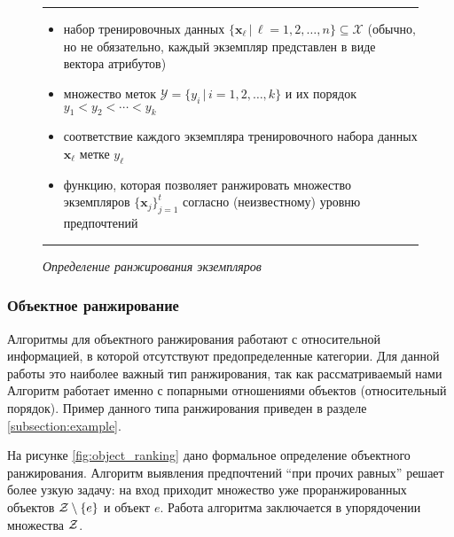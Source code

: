 		\begin{figure}[h]
			\hrule
			\begin{description}[nosep]
				\item[Дано:] \null\leavevmode
				\begin{itemize}[itemsep=0pt,leftmargin=2ex,label=\textbf{---}]
					\item набор тренировочных данных $\{\bm{x}_\ell \, | \, \ell = 1,2,\dots,n\} \subseteq \mathcal{X} $ (обычно, но не обязательно, каждый экземпляр представлен в виде вектора атрибутов)
					\item множество меток $\mathcal{Y} = \{y_i\,|\,i = 1,2,\dotsc,k\}$ и их порядок $y_1 < y_2 < \dotsb < y_k$ 
					\item соответствие каждого экземпляра тренировочного набора данных $\bm{x}_\ell$ метке $y_\ell$
				\end{itemize}
				\item[Найти:] \null\leavevmode
				\begin{itemize}[itemsep=0pt,leftmargin=2ex,label=\textbf{---}]
					\item функцию, которая позволяет ранжировать множество экземпляров $\{\bm{x}_j\}^t_{j=1}$ согласно (неизвестному) уровню предпочтений
				\end{itemize}
			\end{description} 
			\hrule
			\caption{\it Определение ранжирования экземпляров \cite[Рис.~2]{plbook:Introduction:2010}}
			\label{fig:instance_ranking}
		\end{figure}
	
	\subsubsection{Объектное ранжирование}
		Алгоритмы для объектного ранжирования работают с 
		относительной %
		информацией, в которой отсутствуют предопределенные категории. Для данной работы это наиболее важный тип ранжирования, так как рассматриваемый нами Алгоритм работает именно с попарными отношениями объектов (относительный порядок). Пример данного типа ранжирования приведен в разделе \ref{subsection:example}.
		
		На рисунке \ref{fig:object_ranking} дано формальное определение объектного ранжирования. Алгоритм выявления предпочтений \enquote{при прочих равных} решает более узкую задачу: на вход приходит множество уже проранжированных объектов $\mathcal{Z} \setminus \{e\}$ и объект $e$. Работа алгоритма заключается в упорядочении множества $\mathcal{Z}$.
		
